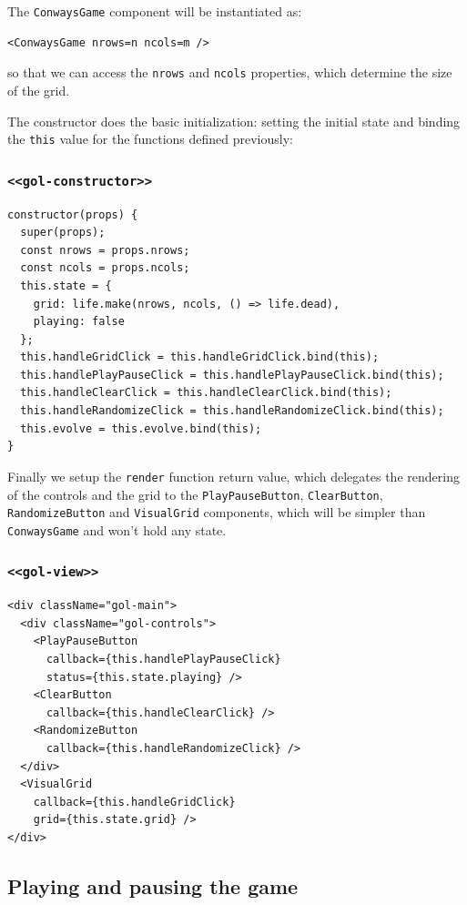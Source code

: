 \documentclass[11pt]{article}
\begin{document}
The \texttt{ConwaysGame} component will be instantiated as:
\begin{verbatim}
<ConwaysGame nrows=n ncols=m />
\end{verbatim}
so that we can access the \texttt{nrows} and \texttt{ncols} properties, which determine the size of the grid.

The constructor does the basic initialization: setting the initial state and binding the \texttt{this} value for the functions defined previously:

\subsubsection*{\texttt{<<gol-constructor>>}}
\label{sec:orgafc5aa2}
\begin{verbatim}
constructor(props) {
  super(props);
  const nrows = props.nrows;
  const ncols = props.ncols;
  this.state = {
    grid: life.make(nrows, ncols, () => life.dead),
    playing: false
  };
  this.handleGridClick = this.handleGridClick.bind(this);
  this.handlePlayPauseClick = this.handlePlayPauseClick.bind(this);
  this.handleClearClick = this.handleClearClick.bind(this);
  this.handleRandomizeClick = this.handleRandomizeClick.bind(this);
  this.evolve = this.evolve.bind(this);
}
\end{verbatim}

Finally we setup the \texttt{render} function return value, which delegates the rendering of the controls and the grid to the \texttt{PlayPauseButton}, \texttt{ClearButton}, \texttt{RandomizeButton} and \texttt{VisualGrid} components, which will be simpler than \texttt{ConwaysGame} and won't hold any state.

\subsubsection*{\texttt{<<gol-view>>}}
\label{sec:org0d931f6}
\begin{verbatim}
<div className="gol-main">
  <div className="gol-controls">
    <PlayPauseButton
      callback={this.handlePlayPauseClick}
      status={this.state.playing} />
    <ClearButton
      callback={this.handleClearClick} />
    <RandomizeButton
      callback={this.handleRandomizeClick} />
  </div>
  <VisualGrid
    callback={this.handleGridClick}
    grid={this.state.grid} />
</div>
\end{verbatim}

\subsection{Playing and pausing the game}
\label{sec:org938d16a}
\end{document}
